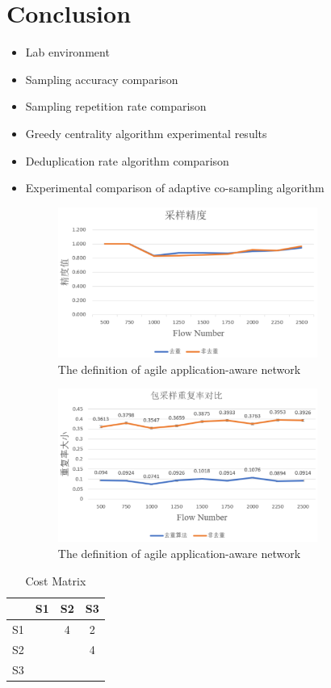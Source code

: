\documentclass[conference,compsoc]{IEEEtran}
\begin{document}
\section{Conclusion}
\begin{itemize}
\item Lab environment
\item Sampling accuracy comparison
\item Sampling repetition rate comparison
\item Greedy centrality algorithm experimental results
 
\item Deduplication rate algorithm comparison

\item Experimental comparison of adaptive co-sampling algorithm

\begin{figure}[!hhhhhhhhhht]
\centering
\includegraphics[width=8.50cm]{images/compare.png}
\caption{The definition of agile application-aware network}
\label{aaa.png}
\end{figure}



\begin{figure}[!hhhhhhhhhht]
\centering
\includegraphics[width=8.50cm]{images/compare2.png}
\caption{The definition of agile application-aware network}
\label{aaa.png}
\end{figure}
\end{itemize}

\begin{table}[]
\centering
\caption{Cost Matrix}
\begin{tabular}{|c|c|c|c|} %
\hline 
&S1&S2&S3\\
\hline  
S1&&4&2\\
\hline 
S2&&&4\\
\hline 
S3&&&\\
\hline 
\end{tabular}
\end{table}
\end{document}
